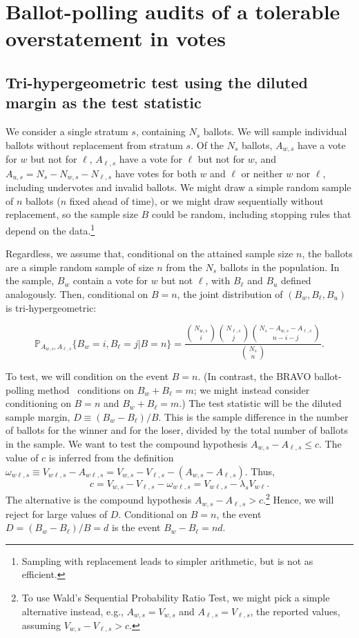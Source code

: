 \section{Ballot-polling audits of a tolerable overstatement in votes}
\label{sec:ballotPollError}

\subsection{Tri-hypergeometric test using the diluted margin as the test statistic}

We consider a single stratum $s$, containing $N_s$ ballots.
We will sample individual ballots without replacement from stratum $s$.
Of the $N_s$ ballots,
$A_{w,s}$ have a vote for $w$ but not for $\ell$, $A_{\ell,s}$ have a vote for $\ell$ but not for $w$, and $A_{u,s} = N_s - N_{w,s} - N_{\ell,s}$ have votes for both $w$ and $\ell$ or neither $w$ nor $\ell$, including undervotes and invalid ballots.
We might draw a simple random sample of $n$ ballots ($n$ fixed ahead of time), or we might draw 
sequentially without replacement, so the sample size $B$ could be random, including stopping rules that depend on the data.\footnote{%
   Sampling with replacement leads to simpler arithmetic, but is not as efficient.
}

Regardless, we assume that, conditional on the attained sample size $n$, the ballots are a simple random sample of size $n$ from the $N_s$ ballots in the population.
In the sample, $B_w$ contain a vote for $w$ but not $\ell$, with $B_\ell$ and $B_u$ defined analogously.
Then, conditional on $B=n$, the joint distribution of
$(B_w, B_\ell, B_u)$ is tri-hypergeometric:

\begin{equation}
    \mathbb{P}_{A_{w,s}, A_{\ell,s}} \{ B_w = i, B_\ell = j \vert B=n \} = 
     \frac{ {N_{w,s } \choose i}{N_{\ell,s} \choose j}{N_s - A_{w,s} - A_{\ell,s} \choose n-i-j}}{{N_s \choose n}}.
\end{equation}

To test, we will condition on the event $B=n$. 
(In contrast, the BRAVO ballot-polling
method~\citep{lindemanEtal12}
conditions on $B_w+B_\ell = m$;
we might instead consider conditioning on $B=n$ and $B_w + B_\ell = m$.)
The test statistic will be the diluted sample margin, $D \equiv (B_w - B_\ell)/B$.
This is the sample difference in the number of ballots for the winner and for the loser, divided by the 
total number of ballots in the sample.
We want to test the compound hypothesis $A_{w,s} - A_{\ell,s} \le c$.
The value of $c$ is inferred from the definition
$\omega_{w\ell,s} \equiv V_{w\ell,s} - A_{w\ell,s} = V_{w,s} - V_{\ell,s} - (A_{w,s} -A_{\ell,s})$.
Thus,
$$
    c = V_{w,s} - V_{\ell,s} - \omega_{w\ell,s} = V_{w\ell,s} - \lambda_s V_{w\ell}.
$$
The alternative is the compound hypothesis 
$A_{w,s} - A_{\ell,s} > c$.\footnote{%
    To use Wald's Sequential Probability Ratio Test, we might pick a simple alternative instead, e.g.,
   $A_{w,s} = V_{w,s}$ and $A_{\ell,s} = V_{\ell,s}$, the reported values, assuming 
   $V_{w,s} - V_{\ell,s} > c$.
}
Hence, we will reject for large values of $D$.
Conditional on $B=n$, the event $D = (B_w - B_\ell)/B = d$ is the event $B_w - B_\ell = nd$.

